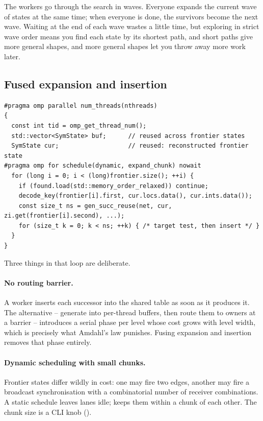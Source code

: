 \begin{intuition}
The workers go through the search in waves.  Everyone expands the current wave
of states at the same time; when everyone is done, the survivors become the
next wave.  Waiting at the end of each wave wastes a little time, but exploring
in strict wave order means you find each state by its shortest path, and short
paths give more general shapes, and more general shapes let you throw away more
work later.
\end{intuition}

\subsection{Fused expansion and insertion}

\begin{center}
\begin{minipage}{0.93\linewidth}
\begin{lstlisting}
#pragma omp parallel num_threads(nthreads)
{
  const int tid = omp_get_thread_num();
  std::vector<SymState> buf;      // reused across frontier states
  SymState cur;                   // reused: reconstructed frontier state
#pragma omp for schedule(dynamic, expand_chunk) nowait
  for (long i = 0; i < (long)frontier.size(); ++i) {
    if (found.load(std::memory_order_relaxed)) continue;
    decode_key(frontier[i].first, cur.locs.data(), cur.ints.data());
    const size_t ns = gen_succ_reuse(net, cur, zi.get(frontier[i].second), ...);
    for (size_t k = 0; k < ns; ++k) { /* target test, then insert */ }
  }
}
\end{lstlisting}
\end{minipage}
\end{center}

Three things in that loop are deliberate.

\paragraph{No routing barrier.}
A worker inserts each successor into the shared table as soon as it produces
it.  The alternative -- generate into per-thread buffers, then route them to
owners at a barrier -- introduces a serial phase per level whose cost grows
with level width, which is precisely what Amdahl's law punishes.  Fusing
expansion and insertion removes that phase entirely.

\paragraph{Dynamic scheduling with small chunks.}
Frontier states differ wildly in cost: one may fire two edges, another may fire
a broadcast synchronisation with a combinatorial number of receiver
combinations.  A static schedule leaves lanes idle; 
keeps them within a chunk of each other.  The chunk size is a CLI knob
().

